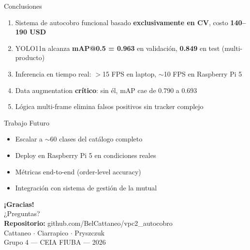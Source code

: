\documentclass[aspectratio=169,10pt]{beamer}
\begin{document}
\begin{frame}{Conclusiones}
  \begin{enumerate}
    \item Sistema de autocobro funcional basado \textbf{exclusivamente en CV}, costo \textbf{140--190 USD}
    \item YOLO11n alcanza \textbf{mAP@0.5 = 0.963} en validación, \textbf{0.849} en test (multi-producto)
    \item Inferencia en tiempo real: $>$15 FPS en laptop, $\sim$10 FPS en Raspberry Pi 5
    \item Data augmentation \textbf{crítico}: sin él, mAP cae de 0.790 a 0.693
    \item Lógica multi-frame elimina falsos positivos sin tracker complejo
  \end{enumerate}
  \vspace{0.3cm}
  \begin{block}{Trabajo Futuro}
    \begin{itemize}
      \item Escalar a $\sim$60 clases del catálogo completo
      \item Deploy en Raspberry Pi 5 en condiciones reales
      \item Métricas end-to-end (order-level accuracy)
      \item Integración con sistema de gestión de la mutual
    \end{itemize}
  \end{block}
\end{frame}

\begin{frame}{}
  \centering
  \vspace{1.5cm}
  {\Large \textbf{¡Gracias!}}\\
  \vspace{0.5cm}
  {\large ¿Preguntas?}\\
  \vspace{1cm}
  \small
  \textbf{Repositorio:} github.com/BelCattaneo/vpc2\_autocobro\\
  \vspace{0.3cm}
  Cattaneo $\cdot$ Ciarrapico $\cdot$ Pryszczuk\\
  Grupo 4 --- CEIA FIUBA --- 2026
\end{frame}
\end{document}
